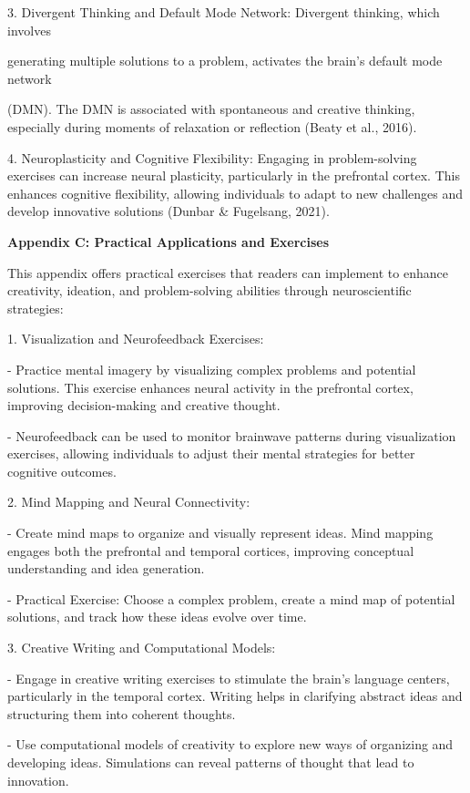 \documentclass[
]{article}
\begin{document}
3. Divergent Thinking and Default Mode Network: Divergent thinking,
which involves

generating multiple solutions to a problem, activates the brain's
default mode network

(DMN). The DMN is associated with spontaneous and creative thinking,
especially during moments of relaxation or reflection (Beaty et al.,
2016).

4. Neuroplasticity and Cognitive Flexibility: Engaging in
problem-solving exercises can increase neural plasticity, particularly
in the prefrontal cortex. This enhances cognitive flexibility, allowing
individuals to adapt to new challenges and develop innovative solutions
(Dunbar \& Fugelsang, 2021).

\textbf{Appendix C: Practical Applications and Exercises}

This appendix offers practical exercises that readers can implement to
enhance creativity, ideation, and problem-solving abilities through
neuroscientific strategies:

1. Visualization and Neurofeedback Exercises:

- Practice mental imagery by visualizing complex problems and potential
solutions. This exercise enhances neural activity in the prefrontal
cortex, improving decision-making and creative thought.

- Neurofeedback can be used to monitor brainwave patterns during
visualization exercises, allowing individuals to adjust their mental
strategies for better cognitive outcomes.

2. Mind Mapping and Neural Connectivity:

- Create mind maps to organize and visually represent ideas. Mind
mapping engages both the prefrontal and temporal cortices, improving
conceptual understanding and idea generation.

- Practical Exercise: Choose a complex problem, create a mind map of
potential solutions, and track how these ideas evolve over time.

3. Creative Writing and Computational Models:

- Engage in creative writing exercises to stimulate the brain's language
centers, particularly in the temporal cortex. Writing helps in
clarifying abstract ideas and structuring them into coherent thoughts.

- Use computational models of creativity to explore new ways of
organizing and developing ideas. Simulations can reveal patterns of
thought that lead to innovation.
\end{document}
